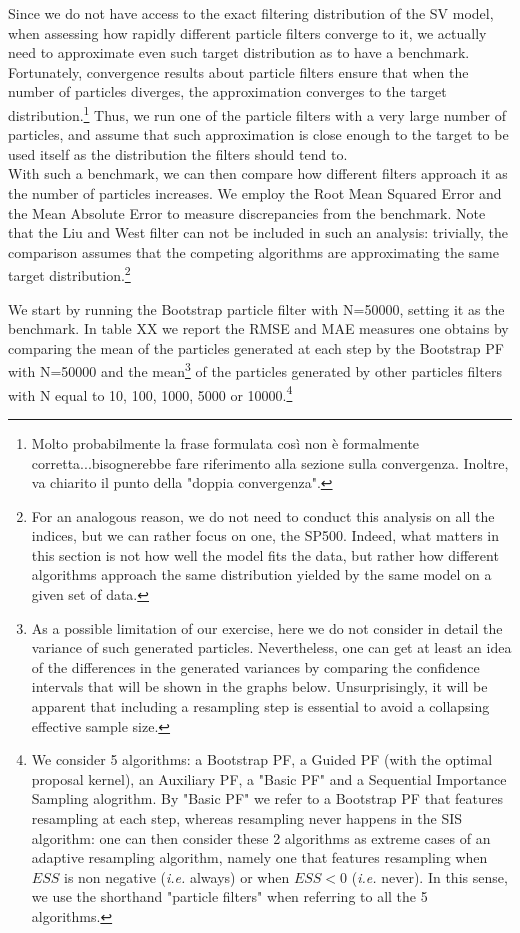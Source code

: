 \documentclass[
]{book}
\theoremstyle{break}
\theoremstyle{nonumberplain}
\begin{document}
Since we do not have access to the exact filtering distribution of the
SV model, when assessing how rapidly different particle filters converge
to it, we actually need to approximate even such target distribution as
to have a benchmark.\\
Fortunately, convergence results about particle filters ensure that when
the number of particles diverges, the approximation converges to the
target
distribution.\footnote{Molto probabilmente la frase formulata così non è formalmente corretta...bisognerebbe fare riferimento alla sezione sulla convergenza. Inoltre, va chiarito il punto della "doppia convergenza".}
Thus, we run one of the particle filters with a very large number of
particles, and assume that such approximation is close enough to the
target to be used itself as the distribution the filters should tend
to.\\
With such a benchmark, we can then compare how different filters
approach it as the number of particles increases. We employ the Root
Mean Squared Error and the Mean Absolute Error to measure discrepancies
from the benchmark. Note that the Liu and West filter can not be
included in such an analysis: trivially, the comparison assumes that the
competing algorithms are approximating the same target
distribution.\footnote{For an analogous reason, we do not need to conduct this analysis on all the indices, but we can rather focus on one, the SP500. Indeed, what matters in this section is not how well the model fits the data, but rather how different algorithms approach the same distribution yielded by the same model on a given set of data.}

We start by running the Bootstrap particle filter with N=50000, setting
it as the benchmark. In table XX we report the RMSE and MAE measures one
obtains by comparing the mean of the particles generated at each step by
the Bootstrap PF with N=50000 and the
mean\footnote{As a possible limitation of our exercise, here we do not consider in detail the variance of such generated particles. Nevertheless, one can get at least an idea of the differences in the generated variances by comparing the confidence intervals that will be shown in the graphs below. Unsurprisingly, it will be apparent that including a resampling step is essential to avoid a collapsing effective sample size.}
of the particles generated by other particles filters with N equal to
10, 100, 1000, 5000 or
10000.\footnote{We consider 5 algorithms: a Bootstrap PF, a Guided PF (with the optimal proposal kernel), an Auxiliary PF, a "Basic PF" and a Sequential Importance Sampling alogrithm. By "Basic PF" we refer to a Bootstrap PF that features resampling at each step, whereas resampling never happens in the SIS algorithm: one can then consider these 2 algorithms as extreme cases of an adaptive resampling algorithm, namely one that features resampling when $ESS$ is non negative (\textit{i.e.} always) or when $ESS<0$ (\textit{i.e.} never). In this sense, we use the shorthand "particle filters" when referring to all the 5 algorithms.}
\end{document}
